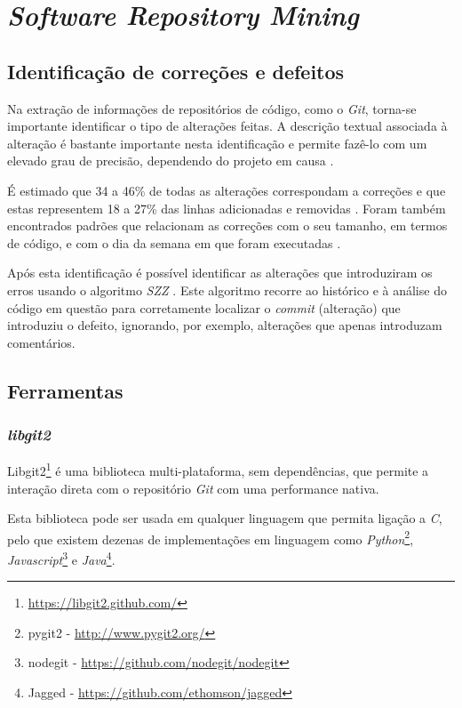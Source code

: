\section{\emph{Software Repository Mining}}

\subsection{Identificação de correções e defeitos}

Na extração de informações de repositórios de código, como o \emph{Git}, torna-se importante identificar o tipo de alterações feitas. A descrição textual associada à alteração é bastante importante nesta identificação e permite fazê-lo com um elevado grau de precisão, dependendo do projeto em causa \cite{Mockus2000}.

É estimado que 34 a 46\% de todas as alterações correspondam a correções e que estas representem 18 a 27\% das linhas adicionadas e removidas \cite{Mockus2000}. Foram também encontrados padrões que relacionam as correções com o seu tamanho, em termos de código, e com o dia da semana em que foram executadas \cite{Sliwerski2005}.

Após esta identificação é possível identificar as alterações que introduziram os erros usando o algoritmo \emph{SZZ} \cite{Sliwerski2005}. Este algoritmo recorre ao histórico e à análise do código em questão para corretamente localizar o \emph{commit} (alteração) que introduziu o defeito, ignorando, por exemplo, alterações que apenas introduzam comentários.

\subsection{Ferramentas}

\subsubsection{\emph{libgit2}}

Libgit2\footnote{\url{https://libgit2.github.com/}} é uma biblioteca multi-plataforma, sem dependências, que permite a interação direta com o repositório \emph{Git} com uma performance nativa.

Esta biblioteca pode ser usada em qualquer linguagem que permita ligação a \emph{C}, pelo que existem dezenas de implementações em linguagem como \emph{Python}\footnote{pygit2 - \url{http://www.pygit2.org/}}, \emph{Javascript}\footnote{nodegit - \url{https://github.com/nodegit/nodegit}} e \emph{Java}\footnote{Jagged - \url{https://github.com/ethomson/jagged}}.

